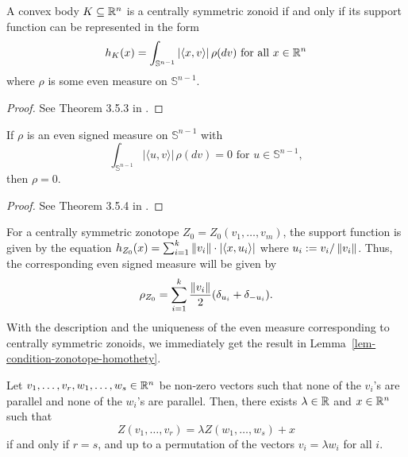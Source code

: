 \documentclass{puthesis-UG}
\begin{document}
\begin{thm} \label{thm:representation-of-zonoid}
	A convex body $K \subseteq \mathbb{R}^n$ is a centrally symmetric zonoid if and only if its support function can be represented in the form 
	\[
		h_K(x) = \int_{\mathbb{S}^{n-1}} |\langle x, v \rangle | \, \rho (dv) \text{ for all $x \in \mathbb{R}^n$}
	\]
	where $\rho$ is some even measure on $\mathbb{S}^{n-1}$.
\end{thm}
\begin{proof}
	See Theorem 3.5.3 in \cite{schneider_2013}.
\end{proof}

\begin{thm} \label{thm:uniqueness-of-even-measure}
	If $\rho$ is an even signed measure on $\mathbb{S}^{n-1}$ with 
	\[
		\int_{\mathbb{S}^{n-1}} |\langle u, v \rangle | \, \rho(dv) = 0 \text{ for } u \in \mathbb{S}^{n-1}, 
	\]
	then $\rho = 0$. 
\end{thm}

\begin{proof}
	See Theorem 3.5.4 in \cite{schneider_2013}. 
\end{proof}

For a centrally symmetric zonotope $Z_0 = Z_0(v_1, \ldots, v_m)$, the support function is given by the equation $h_{Z_0}(x) = \sum_{i = 1}^k \left\lVert v_i\right\rVert \cdot  | \langle x, u_i \rangle |$ where $u_i := v_i / \left\lVert v_i\right\rVert$. Thus, the corresponding even signed measure will be given by 
\begin{equation} \label{eqn:even-signed-measure-of-zonotope}
	\rho_{Z_0} = \sum_{i = 1}^k \frac{\left\lVert v_i\right\rVert}{2} ( \delta_{u_i} + \delta_{-u_i}).
\end{equation}
With the description and the uniqueness of the even measure corresponding to centrally symmetric zonoids, we immediately get the result in Lemma~\ref{lem-condition-zonotope-homothety}. 

\begin{lem} \label{lem-condition-zonotope-homothety}
	Let $v_1, \ldots, v_r, w_1, \ldots, w_s \in \mathbb{R}^n$ be non-zero vectors such that none of the $v_i$'s are parallel and none of the $w_i$'s are parallel. Then, there exists $\lambda \in \mathbb{R}$ and $x \in \mathbb{R}^n$ such that
	\[
		Z(v_1, \ldots, v_r) = \lambda Z(w_1, \ldots, w_s) + x
	\]
	if and only if $r = s$, and up to a permutation of the vectors $v_i = \lambda w_i$ for all $i$.
\end{lem}
\end{document}
